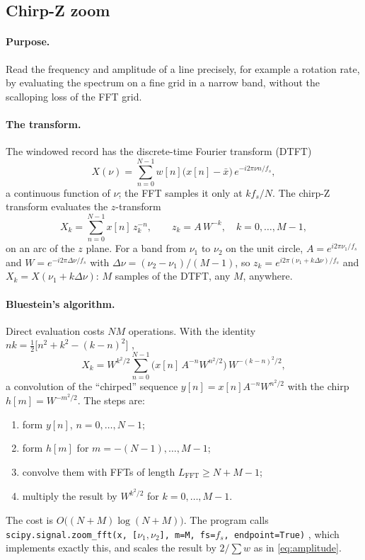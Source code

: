 \documentclass[10pt,letterpaper]{article}
\numberwithin{equation}{section}
\begin{document}
\subsection{Chirp-Z zoom}\label{sec:czt}
\paragraph{Purpose.} Read the frequency and amplitude of a line precisely, for
example a rotation rate, by evaluating the spectrum on a fine grid in a narrow
band, without the scalloping loss of the FFT grid.

\paragraph{The transform.} The windowed record has the discrete-time Fourier
transform (DTFT)
\begin{equation}
X(\nu) = \sum_{n=0}^{N-1} w[n]\big(x[n]-\bar{x}\big)\,e^{-i2\pi\nu n/f_s},
\end{equation}
a continuous function of $\nu$; the FFT samples it only at $k f_s/N$. The
chirp-Z transform \cite{R12} evaluates the $z$-transform
\begin{equation}
X_k = \sum_{n=0}^{N-1} x[n]\,z_k^{-n},\qquad z_k = A\,W^{-k},\quad k = 0,\dots,M-1,
\end{equation}
on an arc of the $z$ plane. For a band from $\nu_1$ to $\nu_2$ on the unit circle,
$A = e^{i2\pi\nu_1/f_s}$ and $W = e^{-i2\pi\Delta\nu/f_s}$ with
$\Delta\nu = (\nu_2-\nu_1)/(M-1)$, so $z_k = e^{i2\pi(\nu_1+k\Delta\nu)/f_s}$ and
$X_k = X(\nu_1 + k\Delta\nu)$: $M$ samples of the DTFT, any $M$, anywhere.

\paragraph{Bluestein's algorithm.} Direct evaluation costs $N M$ operations.
With the identity $nk = \tfrac12\big[n^2 + k^2 - (k-n)^2\big]$ \cite{B19},
\begin{equation}
X_k = W^{k^2/2}\sum_{n=0}^{N-1}\Big(x[n]\,A^{-n}W^{n^2/2}\Big)\,W^{-(k-n)^2/2},
\end{equation}
a convolution of the ``chirped'' sequence $y[n] = x[n]A^{-n}W^{n^2/2}$ with the
chirp $h[m] = W^{-m^2/2}$. The steps are:
\begin{enumerate}
\item form $y[n]$, $n = 0,\dots,N-1$;
\item form $h[m]$ for $m = -(N-1),\dots,M-1$;
\item convolve them with FFTs of length $L_\mathrm{FFT} \ge N + M - 1$;
\item multiply the result by $W^{k^2/2}$ for $k = 0,\dots,M-1$.
\end{enumerate}
The cost is $O\big((N+M)\log(N+M)\big)$. The program calls
\texttt{scipy.signal.zoom\_fft(x, [}$\nu_1,\nu_2$\texttt{], m=M, fs=}$f_s$\texttt{, endpoint=True)}
\cite{B31}, which implements exactly this, and scales the result by $2/\sum w$
as in \eqref{eq:amplitude}.
\end{document}
